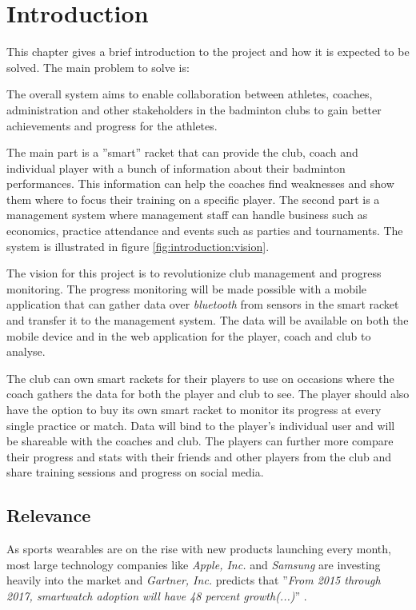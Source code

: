\chapter{Introduction}
This chapter gives a brief introduction to the project and how it is expected to be solved.
The main problem to solve is:


The overall system aims to enable collaboration between athletes, coaches, administration and other stakeholders in the badminton clubs to gain better achievements and progress for the athletes.

The main part is a ''smart'' racket that can provide the club, coach and individual player with a bunch of information about their badminton performances.
This information can help the coaches find weaknesses and show them where to focus their training on a specific player.
The second part is a management system where management staff can handle business such as economics, practice attendance and events such as parties and tournaments.
The system is illustrated in figure \ref{fig:introduction:vision}.


The vision for this project is to revolutionize club management and progress monitoring.
The progress monitoring will be made possible with a mobile application that can gather data over \textit{\gls{bluetooth}} from sensors in the smart racket and transfer it to the management system.
The data will be available on both the mobile device and in the web application for the player, coach and club to analyse.

The club can own smart rackets for their players to use on occasions where the coach gathers the data for both the player and club to see.
The player should also have the option to buy its own smart racket to monitor its progress at every single practice or match.
Data will bind to the player's individual user and will be shareable with the coaches and club.
The players can further more compare their progress and stats with their friends and other players from the club and share training sessions and progress on social media.

\section*{Relevance}
As sports wearables are on the rise with new products launching every month, most large technology companies like \textit{Apple, Inc.} and \textit{Samsung} are investing heavily into the market and \textit{Gartner, Inc.} predicts that ''\textit{From 2015 through 2017, smartwatch adoption will have 48 percent growth(...)}'' \citep{introduction:relevance:gartner}.

